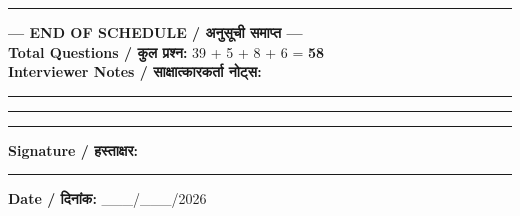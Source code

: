 \documentclass[10pt,a4paper]{article}
\begin{document}
\vspace{3pt}\noindent\rule{\textwidth}{1pt}
\begin{center}
{\large\bfseries --- END OF SCHEDULE / {\hindifont अनुसूची समाप्त} ---}\\[3pt]
\textbf{Total Questions / {\hindifont कुल प्रश्न}:} 39 + 5 + 8 + 6 = \textbf{58}\\[8pt]
\textbf{Interviewer Notes / {\hindifont साक्षात्कारकर्ता नोट्स}:}\vspace{4pt}

\rule{\textwidth}{0.4pt}\vspace{4pt}
\rule{\textwidth}{0.4pt}\vspace{4pt}
\rule{\textwidth}{0.4pt}\vspace{12pt}

\textbf{Signature / {\hindifont हस्ताक्षर}:} \rule{5cm}{0.4pt}\qquad\textbf{Date / {\hindifont दिनांक}:} \_\_\_/\_\_\_/2026
\end{center}
\end{document}
